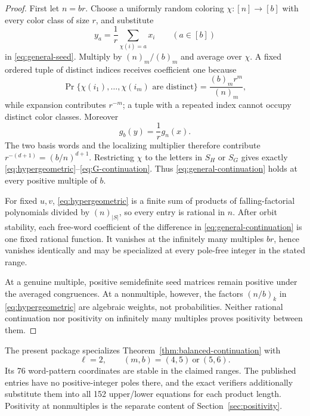 \documentclass[11pt]{article}
\newcommand{\fall}[2]{(#1)_{#2}}
\begin{document}
\begin{proof}
First let \(n=br\).  Choose a uniformly random coloring
\(\chi:[n]\to[b]\) with every color class of size \(r\), and substitute
\[
 y_a=\frac1r\sum_{\chi(i)=a}x_i
 \qquad(a\in[b])
\]
in \eqref{eq:general-seed}.  Multiply by
\(\fall nm/\fall bm\) and average over \(\chi\).  A fixed ordered tuple of
distinct indices receives coefficient one because
\begin{equation}\label{eq:balanced-probability}
 \Pr\{\chi(i_1),\ldots,\chi(i_m)\text{ are distinct}\}
 =\frac{\fall bm r^m}{\fall nm},
\end{equation}
while expansion contributes \(r^{-m}\); a tuple with a repeated index
cannot occupy distinct color classes.  Moreover
\[
 g_b(y)=\frac1r g_n(x).
\]
The two basis words and the localizing multiplier therefore contribute
\(r^{-(d+1)}=(b/n)^{d+1}\).  Restricting \(\chi\) to the letters in
\(S_H\) or \(S_G\) gives exactly
\eqref{eq:hypergeometric}--\eqref{eq:G-continuation}.  Thus
\eqref{eq:general-continuation} holds at every positive multiple of \(b\).

For fixed \(u,v\), \eqref{eq:hypergeometric} is a finite sum of products of
falling-factorial polynomials divided by \(\fall n{|S|}\), so every entry
is rational in \(n\).  After orbit stability, each free-word coefficient of
the difference in \eqref{eq:general-continuation} is one fixed rational
function.  It vanishes at the infinitely many multiples \(br\), hence
vanishes identically and may be specialized at every pole-free integer in
the stated range.

At a genuine multiple, positive semidefinite seed matrices remain positive
under the averaged congruences.  At a nonmultiple, however, the factors
\(\fall{n/b}{k}\) in \eqref{eq:hypergeometric} are algebraic weights, not
probabilities.  Neither rational continuation nor positivity on infinitely
many multiples proves positivity between them.
\end{proof}

The present package specializes Theorem~\ref{thm:balanced-continuation} with
\[
 \ell=2,\qquad (m,b)=(4,5)\ \text{or}\ (5,6).
\]
Its 76 word-pattern coordinates are stable in the claimed ranges.  The
published entries have no positive-integer poles there, and the exact
verifiers additionally substitute them into all 152 upper/lower equations
for each product length.  Positivity at nonmultiples is the separate content
of Section~\ref{sec:positivity}.
\end{document}
